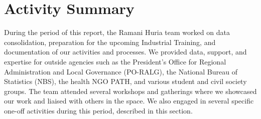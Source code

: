 \documentclass[a4paper,12pt,twoside]{article}
\begin{document}
\newpage
\section{Activity Summary}

During the period of this report, the Ramani Huria team worked on data consolidation, preparation for the upcoming Industrial Training, and documentation of our activities and processes. We provided data, support, and expertise for outside agencies such as the President's Office for Regional Administration and Local Governance (PO-RALG), the National Bureau of Statistics (NBS), the health NGO PATH, and various student and civil society groups. The team attended several workshops and gatherings where we showcased our work and liaised with others in the space. We also engaged in several specific one-off activities during this period, described in this section.
\end{document}
